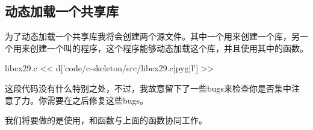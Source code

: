 \subsection{动态加载一个共享库}

为了动态加载一个共享库我将会创建两个源文件。其中一个用来创建一个库，另一个用来创建一个叫的程序，这个程序能够动态加载这个库，并且使用其中的函数。

\begin{code}{libex29.c}
<< d['code/c-skeleton/src/libex29.c|pyg|l'] >>
\end{code}

这段代码没有什么特别之处，不过，我故意留下了一些bugs来检查你是否集中注意了力。你需要在之后修复这些bugs。

我们将要做的是使用，和函数与上面的函数协同工作。

